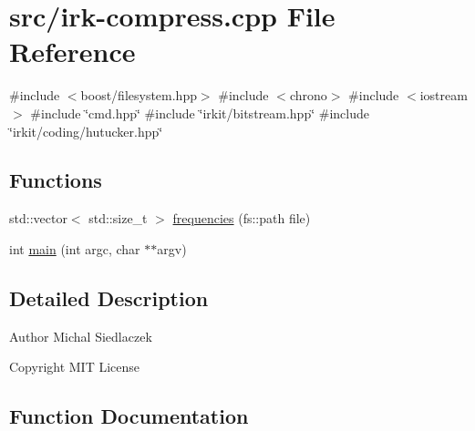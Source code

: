 \hypertarget{irk-compress_8cpp}{}\section{src/irk-\/compress.cpp File Reference}
\label{irk-compress_8cpp}
{\ttfamily \#include $<$boost/filesystem.\+hpp$>$}\newline
{\ttfamily \#include $<$chrono$>$}\newline
{\ttfamily \#include $<$iostream$>$}\newline
{\ttfamily \#include \char`\"{}cmd.\+hpp\char`\"{}}\newline
{\ttfamily \#include \char`\"{}irkit/bitstream.\+hpp\char`\"{}}\newline
{\ttfamily \#include \char`\"{}irkit/coding/hutucker.\+hpp\char`\"{}}\newline
\subsection*{Functions}
\begin{DoxyCompactItemize}
\item 
std\+::vector$<$ std\+::size\+\_\+t $>$ \mbox{\hyperlink{irk-compress_8cpp_a2cd80733ced3d7eda8a6de0389cccc73}{frequencies}} (fs\+::path file)
\item 
int \mbox{\hyperlink{irk-compress_8cpp_a3c04138a5bfe5d72780bb7e82a18e627}{main}} (int argc, char $\ast$$\ast$argv)
\end{DoxyCompactItemize}


\subsection{Detailed Description}
\begin{DoxyAuthor}{Author}
Michal Siedlaczek 
\end{DoxyAuthor}
\begin{DoxyCopyright}{Copyright}
M\+IT License 
\end{DoxyCopyright}


\subsection{Function Documentation}
\mbox{\label{irk-compress_8cpp_a2cd80733ced3d7eda8a6de0389cccc73}} 
